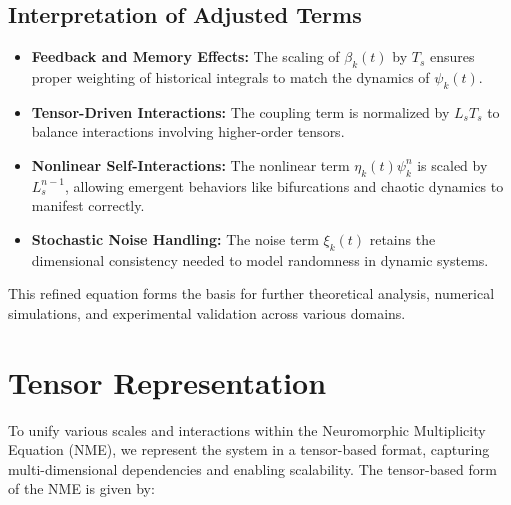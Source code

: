 \documentclass{article}
\theoremstyle{plain}
\begin{document}
\begin{itemize}
\subsection{Interpretation of Adjusted Terms}
\begin{itemize}
    \item \textbf{Feedback and Memory Effects:} The scaling of \(\beta_k(t)\) by \(T_s\) ensures proper weighting of historical integrals to match the dynamics of \(\psi_k(t)\).
    \item \textbf{Tensor-Driven Interactions:} The coupling term is normalized by \(L_s T_s\) to balance interactions involving higher-order tensors.
    \item \textbf{Nonlinear Self-Interactions:} The nonlinear term \(\eta_k(t) \psi_k^n\) is scaled by \(L_s^{n-1}\), allowing emergent behaviors like bifurcations and chaotic dynamics to manifest correctly.
    \item \textbf{Stochastic Noise Handling:} The noise term \(\xi_k(t)\) retains the dimensional consistency needed to model randomness in dynamic systems.
\end{itemize}
This refined equation forms the basis for further theoretical analysis, numerical simulations, and experimental validation across various domains.


\section{Tensor Representation}

To unify various scales and interactions within the Neuromorphic Multiplicity Equation (NME), we represent the system in a tensor-based format, capturing multi-dimensional dependencies and enabling scalability. The tensor-based form of the NME is given by:


\end{itemize}
\end{document}
